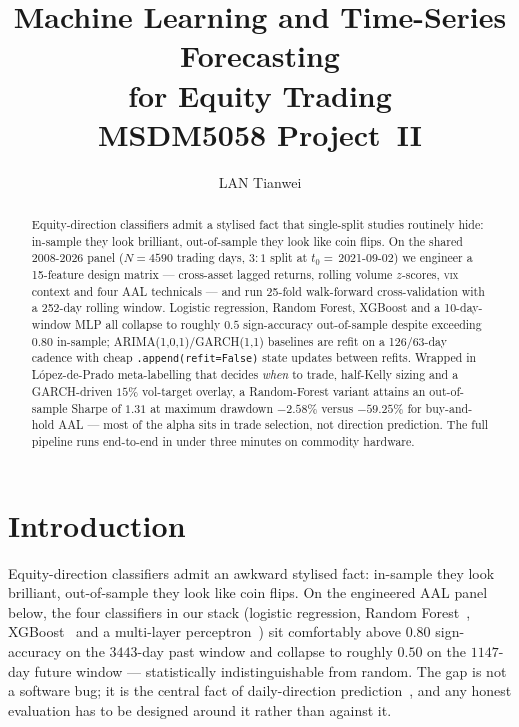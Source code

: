 \documentclass[runningheads]{llncs}
\title{Machine Learning and Time-Series Forecasting\\
for Equity Trading\\
\vspace{0.4em}
\large MSDM5058 Project~II}
\author{LAN Tianwei}
\institute{HKUST -- Information Science MSc Programme\\
MSDM5058 Information Science -- Spring 2026}
\begin{document}
\maketitle
\thispagestyle{empty}
\newpage

\begin{abstract}
Equity-direction classifiers admit a stylised fact that single-split
studies routinely hide: in-sample they look brilliant, out-of-sample
they look like coin flips. On the shared 2008-2026 panel
($N{=}\num{4590}$ trading days, $3{:}1$ split at $t_{0}{=}\,$2021-09-02)
we engineer a 15-feature design matrix --- cross-asset lagged returns,
rolling volume $z$-scores, \textsc{vix} context and four AAL
technicals --- and run 25-fold walk-forward cross-validation with a
252-day rolling window. Logistic regression, Random Forest, XGBoost
and a 10-day-window MLP all collapse to roughly $0.5$ sign-accuracy
out-of-sample despite exceeding $0.80$ in-sample;
ARIMA(1,0,1)/GARCH(1,1) baselines are refit on a 126/63-day cadence
with cheap \verb|.append(refit=False)| state updates between refits.
Wrapped in López-de-Prado meta-labelling that decides \emph{when} to
trade, half-Kelly sizing and a GARCH-driven $15\%$ vol-target overlay,
a Random-Forest variant attains an out-of-sample Sharpe of
$\num{1.31}$ at maximum drawdown $-2.58\%$ versus $-59.25\%$ for
buy-and-hold AAL --- most of the alpha sits in trade selection, not
direction prediction. The full pipeline runs end-to-end in under
three minutes on commodity hardware.
\end{abstract}
\newpage

\tableofcontents
\newpage

\section{Introduction}\label{sec:intro}
Equity-direction classifiers admit an awkward stylised fact: in-sample
they look brilliant, out-of-sample they look like coin flips. On the
engineered AAL panel below, the four classifiers in our stack
(logistic regression, Random Forest~\cite{breiman2001},
XGBoost~\cite{chen2016xgboost} and a multi-layer
perceptron~\cite{kingma2015adam}) sit comfortably above $0.80$
sign-accuracy on the $\num{3443}$-day past window and collapse to
roughly $0.50$ on the $\num{1147}$-day future window --- statistically
indistinguishable from random. The gap is not a software bug; it is
the central fact of daily-direction prediction~\cite{rapach2010},
and any honest evaluation has to be designed around it rather than
against it.
\end{document}

